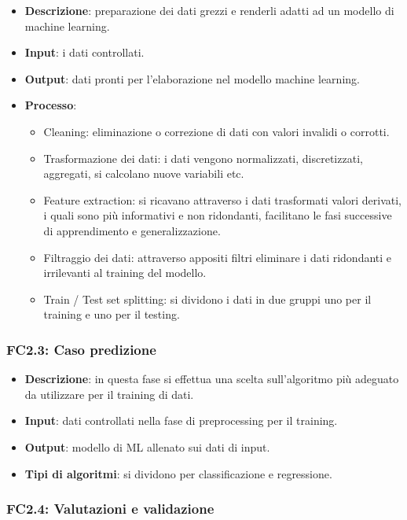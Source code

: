 \begin{itemize}
	\item \textbf{Descrizione}: preparazione dei dati grezzi e renderli adatti ad un modello di machine learning. 
	\item \textbf{Input}: i dati controllati.
	\item \textbf{Output}: dati pronti per l'elaborazione nel modello machine learning.
	\item \textbf{Processo}: \begin{itemize}[leftmargin = 2cm]
		\item Cleaning: eliminazione o correzione di dati con valori invalidi o corrotti.
		\item Trasformazione dei dati: i dati vengono normalizzati, discretizzati, aggregati, si calcolano nuove variabili etc.
		\item Feature extraction: si ricavano attraverso i dati trasformati valori derivati, i quali sono più informativi e non ridondanti, facilitano le fasi successive di apprendimento e generalizzazione.
		\item Filtraggio dei dati: attraverso appositi filtri eliminare i dati ridondanti e irrilevanti al training del modello.
		\item Train / Test set splitting: si dividono i dati in due gruppi uno per il training e uno per il testing.
	\end{itemize}

\end{itemize}

\subsubsection{FC2.3: Caso predizione}

\begin{itemize}
	\item \textbf{Descrizione}: in questa fase si effettua una scelta sull'algoritmo più adeguato da utilizzare per il training di dati.
	\item \textbf{Input}: dati controllati nella fase di preprocessing per il training.
	\item \textbf{Output}: modello di ML allenato sui dati di input.
	\item \textbf{Tipi di algoritmi}: si dividono per classificazione e regressione.%
\end{itemize}

\subsubsection{FC2.4: Valutazioni e validazione}

